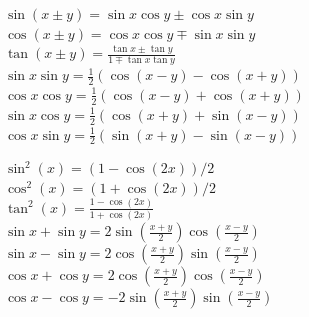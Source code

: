 \documentclass[12pt,a4paper, twoside]{article}
\renewcommand{\=}[1]{\stackrel{#1}{=}}
\theoremstyle{definition}
\theoremstyle{remark}
\begin{document}
\begin{center}
\begin{minipage}[t]{.49\linewidth}
\vspace{0pt}

\noindent$\sin(x\pm y) = \sin x \cos y \pm \cos x \sin y$\\
$\cos(x \pm y) = \cos x \cos y \mp \sin x \sin y$\\
$\tan (x \pm y) = \frac{\tan x \pm \tan y}{1 \mp \tan x \tan y}$\\

\noindent$\sin x \sin y = \frac{1}{2} (\cos (x-y) - \cos (x+y))$\\
$\cos x \cos y = \frac{1}{2} (\cos (x-y) + \cos (x+y))$\\
$\sin x \cos y = \frac{1}{2} (\cos (x+y) + \sin (x-y))$\\
$\cos x \sin y = \frac{1}{2} (\sin (x+y) - \sin (x-y))$

\end{minipage}%
\begin{minipage}[t]{.49\linewidth}
\vspace{0pt}

\noindent$\sin^2 (x) = (1 - \cos (2x))/2$\\
$\cos^2 (x) = (1 + \cos (2x))/2$\\
$\tan^2 (x) = \frac{1 - \cos (2x)}{1 + \cos (2x)}$\\

\noindent$\sin x + \sin y = 2 \sin (\frac{x+y}{2}) \cos (\frac{x-y}{2})$\\
$\sin x - \sin y = 2 \cos (\frac{x+y}{2}) \sin (\frac{x-y}{2})$\\
$\cos x + \cos y = 2 \cos (\frac{x+y}{2}) \cos (\frac{x-y}{2})$\\
$\cos x - \cos y = - 2 \sin (\frac{x+y}{2}) \sin (\frac{x-y}{2})$

\end{minipage}
\end{center}
\end{document}
